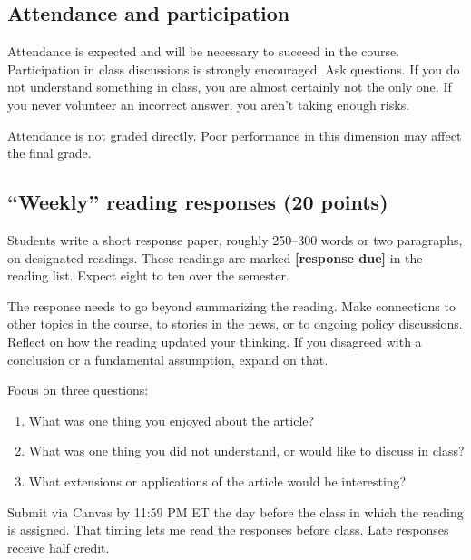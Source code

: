 %
%

\subsection*{Attendance and participation}
Attendance is expected and will be necessary to succeed in the course. Participation in class discussions is strongly encouraged. Ask questions. If you do not understand something in class, you are almost certainly not the only one. If you never volunteer an incorrect answer, you aren't taking enough risks.

\noindent Attendance is not graded directly. Poor performance in this dimension may affect the final grade.

\subsection*{``Weekly'' reading responses (20 points)}
Students write a short response paper, roughly 250--300 words or two paragraphs, on designated readings. These readings are marked \textbf{[response due]} in the reading list. Expect eight to ten over the semester.

\noindent The response needs to go beyond summarizing the reading. Make connections to other topics in the course, to stories in the news, or to ongoing policy discussions. Reflect on how the reading updated your thinking. If you disagreed with a conclusion or a fundamental assumption, expand on that.

\noindent Focus on three questions:
\begin{enumerate}
	\item What was one thing you enjoyed about the article?
	\item What was one thing you did not understand, or would like to discuss in class?
	\item What extensions or applications of the article would be interesting?
\end{enumerate}

\noindent Submit via Canvas by 11:59 PM ET the day before the class in which the reading is assigned. That timing lets me read the responses before class. Late responses receive half credit.


